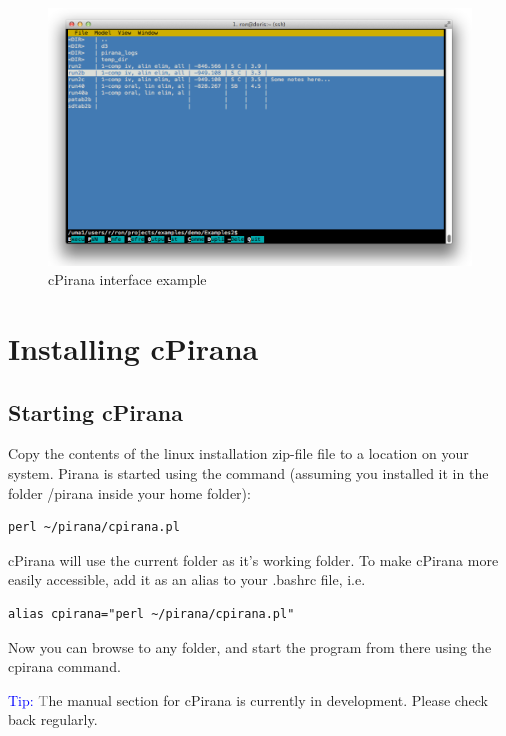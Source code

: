 {{{{\vspace{10pt}

\begin{figure}[hbt] \centering
    \includegraphics[scale=0.3]{images/cpirana_main.png}
    \caption{cPirana interface example}
\end{figure}


\section{Installing cPirana}

\subsection{Starting cPirana}
Copy the contents of the linux installation zip-file file to a location on your system. Pirana is started using the command (assuming you installed it in the folder /pirana inside your home folder):

\begin{lstlisting}
perl ~/pirana/cpirana.pl
\end{lstlisting}

cPirana will use the current folder as it's working folder. To make cPirana more easily accessible, add it as an alias to your .bashrc file, i.e.

\begin{lstlisting}
alias cpirana="perl ~/pirana/cpirana.pl"
\end{lstlisting}

Now you can browse to any folder, and start the program from there
using the {\ttfamily cpirana} command.

\vspace{10pt}
\noindent \scriptsize \textcolor{Blue}{Tip:} \textcolor{Grey} The manual section for cPirana is currently in development. Please check back regularly.
\normalsize


}}}}
